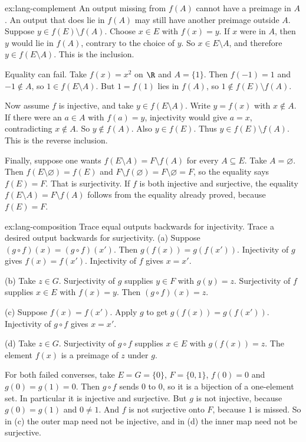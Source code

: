 \begin{solution}{ex:lang-complement}
\idea An output missing from $f(A)$ cannot have a preimage in $A$. An output that does lie in $f(A)$ may still have another preimage outside $A$.
\writeup Suppose $y\in f(E)\setminus f(A)$. Choose $x\in E$ with $f(x)=y$. If $x$ were in $A$, then $y$ would lie in $f(A)$, contrary to the choice of $y$. So $x\in E\setminus A$, and therefore $y\in f(E\setminus A)$. This is the inclusion.

Equality can fail. Take $f(x)=x^2$ on $\R$ and $A=\{1\}$. Then $f(-1)=1$ and $-1\notin A$, so $1\in f(E\setminus A)$. But $1=f(1)$ lies in $f(A)$, so $1\notin f(E)\setminus f(A)$.

Now assume $f$ is injective, and take $y\in f(E\setminus A)$. Write $y=f(x)$ with $x\notin A$. If there were an $a\in A$ with $f(a)=y$, injectivity would give $a=x$, contradicting $x\notin A$. So $y\notin f(A)$. Also $y\in f(E)$. Thus $y\in f(E)\setminus f(A)$. This is the reverse inclusion.

Finally, suppose one wants $f(E\setminus A)=F\setminus f(A)$ for every $A\subseteq E$. Take $A=\varnothing$. Then $f(E\setminus\varnothing)=f(E)$ and $F\setminus f(\varnothing)=F\setminus\varnothing=F$, so the equality says $f(E)=F$. That is surjectivity. If $f$ is both injective and surjective, the equality $f(E\setminus A)=F\setminus f(A)$ follows from the equality already proved, because $f(E)=F$.
\end{solution}

\begin{solution}{ex:lang-composition}
\idea Trace equal outputs backwards for injectivity. Trace a desired output backwards for surjectivity.
\writeup (a) Suppose $(g\circ f)(x)=(g\circ f)(x')$. Then $g(f(x))=g(f(x'))$. Injectivity of $g$ gives $f(x)=f(x')$. Injectivity of $f$ gives $x=x'$.

(b) Take $z\in G$. Surjectivity of $g$ supplies $y\in F$ with $g(y)=z$. Surjectivity of $f$ supplies $x\in E$ with $f(x)=y$. Then $(g\circ f)(x)=z$.

(c) Suppose $f(x)=f(x')$. Apply $g$ to get $g(f(x))=g(f(x'))$. Injectivity of $g\circ f$ gives $x=x'$.

(d) Take $z\in G$. Surjectivity of $g\circ f$ supplies $x\in E$ with $g(f(x))=z$. The element $f(x)$ is a preimage of $z$ under $g$.

For both failed converses, take $E=G=\{0\}$, $F=\{0,1\}$, $f(0)=0$ and $g(0)=g(1)=0$. Then $g\circ f$ sends $0$ to $0$, so it is a bijection of a one-element set. In particular it is injective and surjective. But $g$ is not injective, because $g(0)=g(1)$ and $0\ne 1$. And $f$ is not surjective onto $F$, because $1$ is missed. So in (c) the outer map need not be injective, and in (d) the inner map need not be surjective.
\end{solution}

